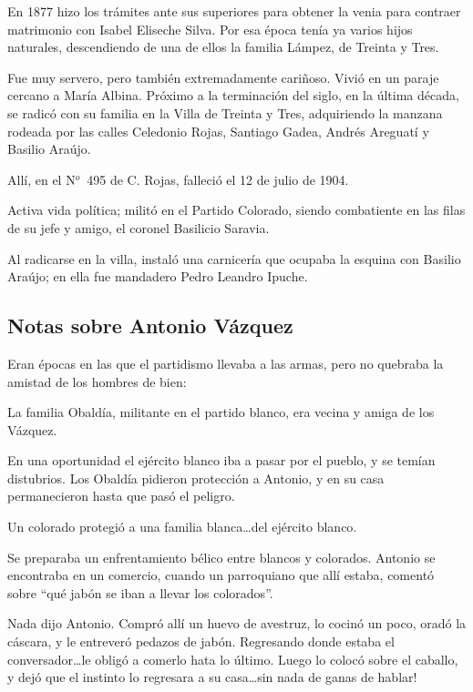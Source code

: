 \documentclass[a4paper]{article}
\begin{document}
\bigbreak{}

En 1877 hizo los trámites ante sus superiores para obtener la venia para contraer matrimonio con Isabel Eliseche Silva. Por esa época tenía ya varios hijos naturales, descendiendo de una de ellos la familia Lámpez, de Treinta y Tres.

Fue muy servero, pero también extremadamente cariñoso. Vivió en un paraje cercano a María Albina. Próximo a la terminación del siglo, en la última década, se radicó con su familia en la Villa de Treinta y Tres, adquiriendo la manzana rodeada por las calles Celedonio Rojas, Santiago Gadea, Andrés Areguatí y Basilio Araújo.

Allí, en el N$^o$~495 de C. Rojas, falleció el 12 de julio de 1904.

Activa vida política; militó en el Partido Colorado, siendo combatiente en las filas de su jefe y amigo, el coronel Basilicio Saravia.

Al radicarse en la villa, instaló una carnicería que ocupaba la esquina con Basilio Araújo; en ella fue mandadero Pedro Leandro Ipuche.

\subsection{Notas sobre Antonio Vázquez}

Eran épocas en las que el partidismo llevaba a las armas, pero no quebraba la amistad de los hombres de bien:

La familia Obaldía, militante en el partido blanco, era vecina y amiga de los Vázquez.

En una oportunidad el ejército blanco iba a pasar por el pueblo, y se temían distubrios. Los Obaldía pidieron protección a Antonio, y en su casa permanecieron hasta que pasó el peligro.


Un colorado protegió a una familia blanca\ldots del ejército blanco.

\bigbreak{}

Se preparaba un enfrentamiento bélico entre blancos y colorados. Antonio se encontraba en un comercio, cuando un parroquiano que allí estaba, comentó sobre ``qué jabón se iban a llevar los colorados''.

Nada dijo Antonio. Compró allí un huevo de avestruz, lo cocinó un poco, oradó la cáscara, y le entreveró pedazos de jabón. Regresando donde estaba el conversador\ldots le obligó a comerlo hata lo último. Luego lo colocó sobre el caballo, y dejó que el instinto lo regresara a su casa\ldots sin nada de ganas de hablar!
\end{document}
